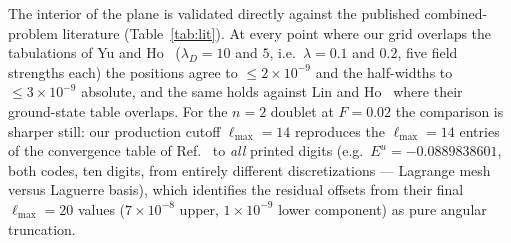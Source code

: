 \documentclass[aps,pra,twocolumn,superscriptaddress,floatfix,longbibliography]{revtex4-2}
\begin{document}
The interior of the plane is validated directly against the published
combined-problem literature (Table~\ref{tab:lit}). At every point
where our grid overlaps the tabulations of Yu and Ho~\cite{YuHo2005}
($\lambda_D=10$ and $5$, i.e.\ $\lambda=0.1$ and $0.2$, five field
strengths each) the positions agree to $\leq2\times10^{-9}$ and the
half-widths to $\leq3\times10^{-9}$ absolute, and the same holds
against Lin and Ho~\cite{LinHo2011} where their ground-state table
overlaps. For the $n=2$ doublet at $F=0.02$ the comparison is
sharper still: our production cutoff $\ell_{\max}=14$ reproduces the
$\ell_{\max}=14$ entries of the convergence table of
Ref.~\cite{LinHo2011} to \emph{all} printed digits (e.g.\
$E^{u}=-0.0889838601$, both codes, ten digits, from entirely
different discretizations --- Lagrange mesh versus Laguerre basis),
which identifies the residual offsets from their final
$\ell_{\max}=20$ values ($7\times10^{-8}$ upper, $1\times10^{-9}$
lower component) as pure angular truncation.
\end{document}
